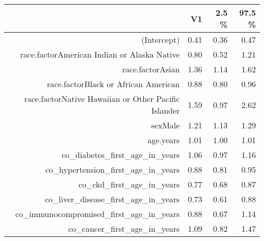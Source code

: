 \begin{table}[ht]
\centering
\begin{tabular}{rrrr}
  \hline
 & V1 & 2.5 \% & 97.5 \% \\ 
  \hline
(Intercept) & 0.41 & 0.36 & 0.47 \\ 
  race.factorAmerican Indian or Alaska Native & 0.80 & 0.52 & 1.21 \\ 
  race.factorAsian & 1.36 & 1.14 & 1.62 \\ 
  race.factorBlack or African American & 0.88 & 0.80 & 0.96 \\ 
  race.factorNative Hawaiian or Other Pacific Islander & 1.59 & 0.97 & 2.62 \\ 
  sexMale & 1.21 & 1.13 & 1.29 \\ 
  age.years & 1.01 & 1.00 & 1.01 \\ 
  co\_diabetes\_first\_age\_in\_years & 1.06 & 0.97 & 1.16 \\ 
  co\_hypertension\_first\_age\_in\_years & 0.88 & 0.81 & 0.95 \\ 
  co\_ckd\_first\_age\_in\_years & 0.77 & 0.68 & 0.87 \\ 
  co\_liver\_disease\_first\_age\_in\_years & 0.73 & 0.61 & 0.88 \\ 
  co\_immunocompromised\_first\_age\_in\_years & 0.88 & 0.67 & 1.14 \\ 
  co\_cancer\_first\_age\_in\_years & 1.09 & 0.82 & 1.47 \\ 
   \hline
\end{tabular}
\end{table}

